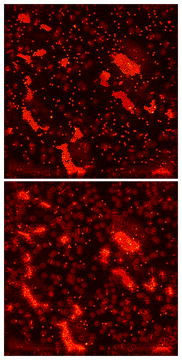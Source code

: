 \documentclass[9pt,twocolumn,twoside]{osajnl}
\begin{document}
\begin{figure}[H]
\centering
\begin{subfigure}[b]{0.95\columnwidth}
  \centering
    \begin{minipage}[b]{0.3\columnwidth}
      \includegraphics[width=1\columnwidth]{bp_reobj1}
      \includegraphics[width=1\columnwidth]{bp_reobj2}

\end{minipage}
\end{subfigure}
\end{figure}
\end{document}
